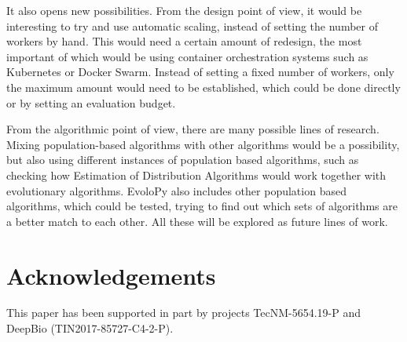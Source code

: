 \documentclass[review]{elsarticle}
\begin{document}
It also opens new possibilities. From the design point of view, it
would be interesting to try and use automatic scaling, instead of
setting the number of workers by hand. This would need a certain
amount of redesign, the most important of which would be using
container orchestration systems such as Kubernetes or Docker
Swarm. Instead of setting a fixed number of workers, only the maximum
amount would need to be established, which could be done directly or
by setting an evaluation budget.

From the algorithmic point of view, there are many possible lines of
research. Mixing population-based algorithms with other algorithms
would be a possibility, but also using different instances of
population based algorithms, such as checking how Estimation of
Distribution Algorithms would work together with evolutionary
algorithms. EvoloPy also includes other population based algorithms,
which could be tested, trying to find out which sets of algorithms are
a better match to each other. All these will be explored as future
lines of work.

\section{Acknowledgements}

This paper has been supported in part by projects TecNM-5654.19-P and DeepBio
(TIN2017-85727-C4-2-P).



\end{document}

